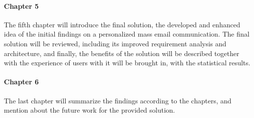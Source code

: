 \paragraph{Chapter 5} The fifth chapter will introduce the final solution, the developed and enhanced idea of the initial findings on a personalized mass email communication. The final solution will be reviewed, including its improved requirement analysis and architecture, and finally, the benefits of the solution will be described together with the experience of users with it will be brought in, with the statistical results.

\paragraph{Chapter 6} The last chapter will summarize the findings according to the chapters, and mention about the future work for the provided solution.

\clearemptydoublepage

